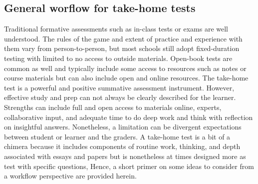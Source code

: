 \documentclass[
]{book}
\begin{document}
\hypertarget{general-worflow-for-take-home-tests}{%
\subsection*{General worflow for take-home tests}\label{general-worflow-for-take-home-tests}}

Traditional formative assessments such as in-class tests or exams are well understood. The rules of the game and extent of practice and experience with them vary from person-to-person, but most schools still adopt fixed-duration testing with limited to no access to outside materials. Open-book tests are common as well and typically include some access to resources such as notes or course materials but can also include open and online resources. The take-home test is a powerful and positive summative assessment instrument. However, effective study and prep can not always be clearly described for the learner. Strengths can include full and open access to materials online, experts, collaborative input, and adequate time to do deep work and think with reflection on insightful answers. Nonetheless, a limitation can be divergent expectations between student or learner and the graders. A take-home test is a bit of a chimera because it includes components of routine work, thinking, and depth associated with essays and papers but is nonetheless at times designed more as test with specific questions, Hence, a short primer on some ideas to consider from a workflow perspective are provided herein.
\end{document}
